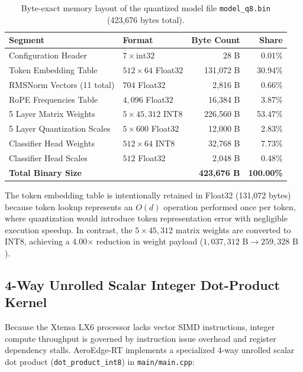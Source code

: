 \documentclass[10pt,a4paper]{article}
\begin{document}
\begin{table}[h]
\centering
\small
\caption{Byte-exact memory layout of the quantized model file \texttt{model\_q8.bin} (423,676 bytes total).}
\label{tab:storage_layout}
\begin{tabular}{l l r r}
\toprule
\textbf{Segment} & \textbf{Format} & \textbf{Byte Count} & \textbf{Share} \\
\midrule
Configuration Header & $7 \times \text{int32}$ & 28 B & 0.01\% \\
Token Embedding Table & $512 \times 64$ Float32 & 131,072 B & 30.94\% \\
RMSNorm Vectors (11 total) & $704$ Float32 & 2,816 B & 0.66\% \\
RoPE Frequencies Table & $4,096$ Float32 & 16,384 B & 3.87\% \\
5 Layer Matrix Weights & $5 \times 45,312$ INT8 & 226,560 B & 53.47\% \\
5 Layer Quantization Scales & $5 \times 600$ Float32 & 12,000 B & 2.83\% \\
Classifier Head Weights & $512 \times 64$ INT8 & 32,768 B & 7.73\% \\
Classifier Head Scales & $512$ Float32 & 2,048 B & 0.48\% \\
\midrule
\textbf{Total Binary Size} & & \textbf{423,676 B} & \textbf{100.00\%} \\
\bottomrule
\end{tabular}
\end{table}

The token embedding table is intentionally retained in Float32 (131,072 bytes) because token lookup represents an $O(d)$ operation performed once per token, where quantization would introduce token representation error with negligible execution speedup. In contrast, the $5 \times 45,312$ matrix weights are converted to INT8, achieving a 4.00$\times$ reduction in weight payload ($1,037,312\text{ B} \rightarrow 259,328\text{ B}$).

\subsection{4-Way Unrolled Scalar Integer Dot-Product Kernel}
Because the Xtensa LX6 processor lacks vector SIMD instructions, integer compute throughput is governed by instruction issue overhead and register dependency stalls. AeroEdge-RT implements a specialized 4-way unrolled scalar dot product (\texttt{dot\_product\_int8}) in \texttt{main/main.cpp}:
\end{document}
